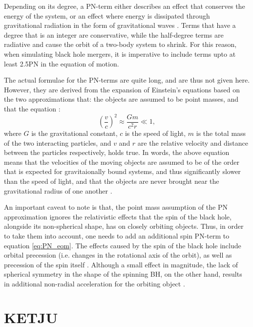 \documentclass[english, twoside]{HYgradu}
\begin{document}
Depending on its degree, a PN-term either describes an effect that conserves the energy of the system, or an effect where energy is dissipated through gravitational radiation in the form of gravitational waves \citep{Mora2004}. Terms that have a degree that is an integer are conservative, while the half-degree terms are radiative and cause the orbit of a two-body system to shrink. For this reason, when simulating black hole mergers, it is imperative to include terms upto at least 2.5PN in the equation of motion.

The actual formulae for the PN-terms are quite long, and are thus not given here. However, they are derived from the expansion of Einstein's equations based on the two approximations that: the objects are assumed to be point masses, and that the equation \citep{MerrittBook}:
\begin{equation}
\left( \frac{v}{c} \right)^2 \approx \frac{Gm}{c^2r} \ll 1,
\end{equation}
where $G$ is the gravitational constant, $c$ is the speed of light, $m$ is the total mass of the two interacting particles, and $v$ and $r$ are the relative velocity and distance between the particles respectively, holds true. In words, the above equation means that the velocities of the moving objects are assumed to be of the order that is expected for gravitaionally bound systems, and thus significantly slower than the speed of light, and that the objects are never brought near the gravitational radius of one another \citep{MerrittBook}. 

An important caveat to note is that, the point mass assumption of the PN approximation ignores the relativistic effects that the spin of the black hole, alongside its non-spherical shape, has on closely orbiting objects. Thus, in order to take them into account, one needs to add an additional spin PN-term to equation \ref{eq:PN_eom}. The effects caused by the spin of the black hole include orbital precession (i.e. changes in the rotational axis of the orbit), as well as precession of the spin itself \citep{Kidder1995}. Although a small effect in magnitude, the lack of spherical symmetry in the shape of the spinning BH, on the other hand, results in additional non-radial acceleration for the orbiting object \citep{MerrittBook}. 

  \chapter{KETJU}
\end{document}
